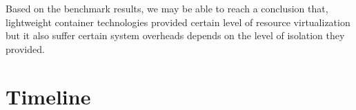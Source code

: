 \documentclass{article}
\begin{document}
\medskip

Based on the benchmark results, we may be able to reach a conclusion that, lightweight container technologies 
provided certain level of resource virtualization but it also suffer certain system overheads depends on the level
of isolation they provided.

\section{Timeline}






\end{document}
